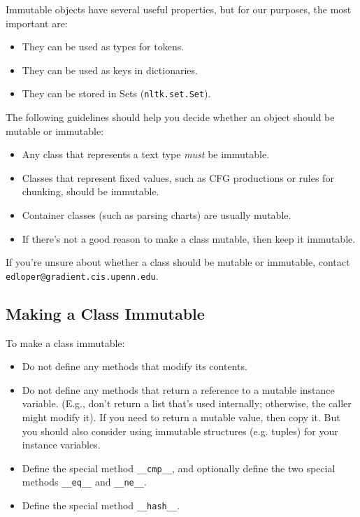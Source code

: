\documentclass{article}
\begin{document}
Immutable objects have several useful properties, but for our
purposes, the most important are:

\begin{itemize}
\item They can be used as types for tokens.
\item They can be used as keys in dictionaries.
\item They can be stored in Sets (\texttt{nltk.set.Set}).
\end{itemize}

The following guidelines should help you decide whether an object
should be mutable or immutable:

\begin{itemize}
\item Any class that represents a text type \textit{must} be
  immutable.
\item Classes that represent fixed values, such as CFG productions or
  rules for chunking, should be immutable.
\item Container classes (such as parsing charts) are usually mutable.
\item If there's not a good reason to make a class mutable, then keep
  it immutable.
\end{itemize}

If you're unsure about whether a class should be mutable or immutable,
contact \texttt{edloper@gradient.cis.upenn.edu}.

\subsection{Making a Class Immutable}

To make a class immutable:
\begin{itemize}
\item Do not define any methods that modify its contents.
\item Do not define any methods that return a reference to a mutable
  instance variable.  (E.g., don't return a list that's used
  internally; otherwise, the caller might modify it).  If you need to
  return a mutable value, then copy it.  But you should also consider
  using immutable structures (e.g. tuples) for your instance
  variables.
\item Define the special method \texttt{\_\_cmp\_\_}, and optionally
  define the two special methods \texttt{\_\_eq\_\_} and \texttt{\_\_ne\_\_}.
\item Define the special method \texttt{\_\_hash\_\_}.
\end{itemize}
\end{document}

